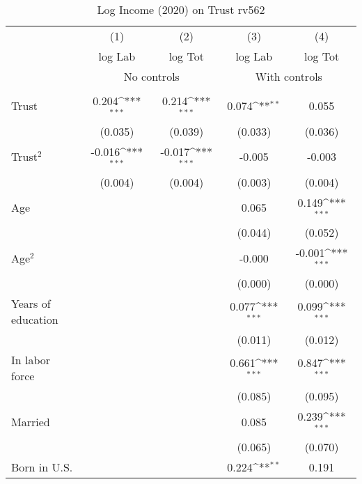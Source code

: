 \begin{table}[htbp]\centering
\def\sym#1{\ifmmode^{#1}\else\(^{#1}\)\fi}
\caption{Log Income (2020) on Trust rv562}
\begin{tabular}{l*{4}{c}}
\toprule
          &\multicolumn{1}{c}{(1)}&\multicolumn{1}{c}{(2)}&\multicolumn{1}{c}{(3)}&\multicolumn{1}{c}{(4)}\\
          &\multicolumn{1}{c}{log Lab}&\multicolumn{1}{c}{log Tot}&\multicolumn{1}{c}{log Lab}&\multicolumn{1}{c}{log Tot}\\
& \multicolumn{2}{c}{No controls} & \multicolumn{2}{c}{With controls} \\\\ \cmidrule(lr){2-3}\cmidrule(lr){4-5}
Trust     &    0.204\sym{***}&    0.214\sym{***}&    0.074\sym{**} &    0.055         \\
          &  (0.035)         &  (0.039)         &  (0.033)         &  (0.036)         \\
Trust$^{2}$&   -0.016\sym{***}&   -0.017\sym{***}&   -0.005         &   -0.003         \\
          &  (0.004)         &  (0.004)         &  (0.003)         &  (0.004)         \\
Age       &                  &                  &    0.065         &    0.149\sym{***}\\
          &                  &                  &  (0.044)         &  (0.052)         \\
Age$^{2}$ &                  &                  &   -0.000         &   -0.001\sym{***}\\
          &                  &                  &  (0.000)         &  (0.000)         \\
Years of education&                  &                  &    0.077\sym{***}&    0.099\sym{***}\\
          &                  &                  &  (0.011)         &  (0.012)         \\
In labor force&                  &                  &    0.661\sym{***}&    0.847\sym{***}\\
          &                  &                  &  (0.085)         &  (0.095)         \\
Married   &                  &                  &    0.085         &    0.239\sym{***}\\
          &                  &                  &  (0.065)         &  (0.070)         \\
Born in U.S.&                  &                  &    0.224\sym{**} &    0.191         \\

\end{tabular}
\end{table}
